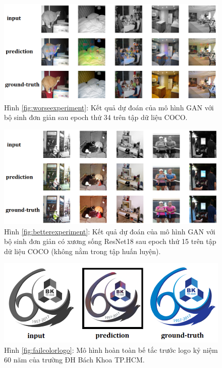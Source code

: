 \documentclass[a4paper, 12pt]{article}
\begin{document}
\begin{figure}[!h]
\captionsetup{width=0.8\textwidth}
\centering
\includegraphics[width=15cm]{images/4_0.png}
\caption*{Hình \ref{fig:worseexperiment}: Kết quả dự đoán của mô hình GAN với bộ sinh đơn giản sau epoch thứ 34 trên tập dữ liệu COCO.}
\end{figure}

\begin{figure}[!h]
\captionsetup{width=0.8\textwidth}
\centering
\includegraphics[width=15cm]{images/4_1.png}
\caption*{Hình \ref{fig:betterexperiment}: Kết quả dự đoán của mô hình GAN với bộ sinh đơn giản có xương sống ResNet18 sau epoch thứ 15 trên tập dữ liệu COCO (không nằm trong tập huấn luyện).}
\end{figure}

\begin{figure}[!h]
\captionsetup{width=0.8\textwidth}
\centering
\includegraphics[width=15cm]{images/4_12.PNG}
\caption*{Hình \ref{fig:failcolorlogo}: Mô hình hoàn toàn bế tắc trước logo kỷ niệm 60 năm của trường ĐH Bách Khoa TP.HCM.}
\end{figure}
\end{document}

